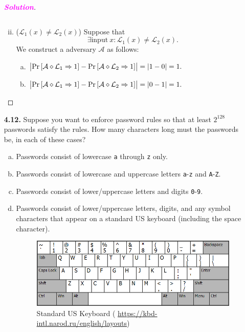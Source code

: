 \documentclass[12pt,openany]{book}
\theoremstyle{definition}
\renewcommand{\abs}[1]{\left\lvert #1 \right\rvert}
\newcommand{\sol}{\textcolor{magenta}{\bf Solution}}
\newcommand{\library}{\mathcal{L}}
\newcommand{\adversary}{\mathcal{A}}
\newcommand{\linking}{\diamond}
\newcommand{\outputs}{\Rightarrow}
\begin{document}
\begin{itemize}
\begin{proof}[\sol]
\begin{enumerate}[(i)]
\[					\]
					\item ($\library_{1}(x)\neq\library_{2}(x)$) Suppose that \[
					\exists\text{input}\ x:\library_{1}(x)\neq\library_{2}(x).
					\] We construct a adversary \(\adversary\) as follows:
					\begin{enumerate}[(a)]
						\item \(\abs{\Pr\sbr{\adversary\linking\library_{1}\outputs 1}-\Pr\sbr{\adversary\linking\library_{2}\outputs 1}}=\abs{1-0}=1.\)
						\item \(\abs{\Pr\sbr{\adversary\linking\library_{1}\outputs 1}-\Pr\sbr{\adversary\linking\library_{2}\outputs 1}}=\abs{0-1}=1.\)
					\end{enumerate}
				\end{enumerate}
			\end{proof}
		\newpage
		\item[\bf 4.12.] Suppose you want to enforce password rules so that at least \(2^{128}\) passwords satisfy the
		rules. How many characters long must the passwords be, in each of these cases?
		\begin{enumerate}[(a)]
			\item Passwords consist of lowercase \textcolor{red!70!black}{\texttt{a}} through \textcolor{red!70!black}{\texttt{z}} only.
			\item Passwords consist of lowercase and uppercase letters \textcolor{red!70!black}{\texttt{a}}-\textcolor{red!70!black}{\texttt{z}} and \textcolor{red!70!black}{\texttt{A}}-\textcolor{red!70!black}{\texttt{Z}}.
			\item Passwords consist of lower/uppercase letters and digits \textcolor{red!70!black}{\texttt{0}}-\textcolor{red!70!black}{\texttt{9}}.
			\item Passwords consist of lower/uppercase letters, digits, and any symbol characters that appear on a standard US keyboard (including the space character).\begin{figure}[h!]
				\centering
				\includegraphics[scale=.8]{us_std_keyboard.png}
				\caption{Standard US Keyboard ( \url{https://kbd-intl.narod.ru/english/layouts})}

\end{figure}
\end{enumerate}
\end{itemize}
\end{document}
